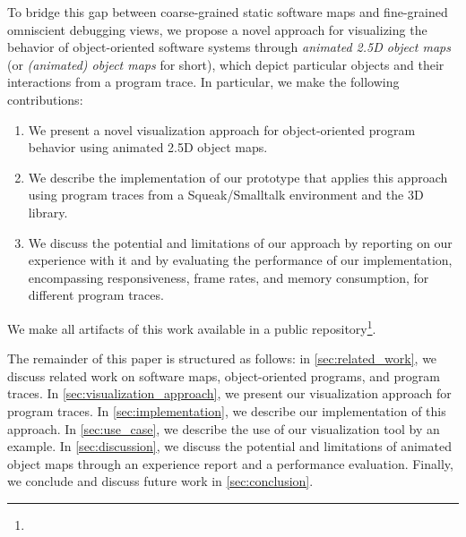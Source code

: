 To bridge this gap between coarse-grained static software maps and fine-grained omniscient debugging views, we propose a novel approach for visualizing the behavior of object-oriented software systems through \emph{animated 2.5D object maps} (or \emph{(animated) object maps} for short), which depict particular objects and their interactions from a program trace.
In particular, we make the following contributions:

\begin{enumerate}
	\item We present a novel visualization approach for ob\-ject-ori\-ent\-ed program behavior using animated 2.5D object maps.
	\item We describe the implementation of our prototype \tfd{} that applies this approach using program traces from a Squeak/\?Smalltalk environment and the  3D library.
	\item We discuss the potential and limitations of our approach by reporting on our experience with it and by evaluating the performance of our implementation, encompassing responsiveness, frame rates, and memory consumption, for different program traces.
\end{enumerate}

We make all artifacts of this work available in a public repository\footnote{}.

The remainder of this paper is structured as follows:
in \cref{sec:related_work}, we discuss related work on software maps, object-oriented programs, and program traces.
In \cref{sec:visualization_approach}, we present our visualization approach for program traces.
In \cref{sec:implementation}, we describe our implementation of this approach.
In \cref{sec:use_case}, we describe the use of our visualization tool by an example.
In \cref{sec:discussion}, we discuss the potential and limitations of animated object maps through an experience report and a performance evaluation.
Finally, we conclude and discuss future work in \cref{sec:conclusion}.
